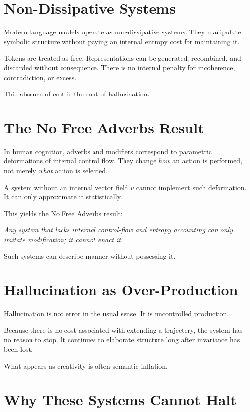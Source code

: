 \documentclass[11pt]{book}
\begin{document}
\section{Non-Dissipative Systems}

Modern language models operate as non-dissipative systems. They manipulate symbolic structure without paying an internal entropy cost for maintaining it.

Tokens are treated as free. Representations can be generated, recombined, and discarded without consequence. There is no internal penalty for incoherence, contradiction, or excess.

This absence of cost is the root of hallucination.

\section{The No Free Adverbs Result}

In human cognition, adverbs and modifiers correspond to parametric deformations of internal control flow. They change \emph{how} an action is performed, not merely \emph{what} action is selected.

A system without an internal vector field \(v\) cannot implement such deformation. It can only approximate it statistically.

This yields the No Free Adverbs result:

\emph{Any system that lacks internal control-flow and entropy accounting can only imitate modification; it cannot enact it.}

Such systems can describe manner without possessing it.

\section{Hallucination as Over-Production}

Hallucination is not error in the usual sense. It is uncontrolled production.

Because there is no cost associated with extending a trajectory, the system has no reason to stop. It continues to elaborate structure long after invariance has been lost.

What appears as creativity is often semantic inflation.

\section{Why These Systems Cannot Halt}
\end{document}
